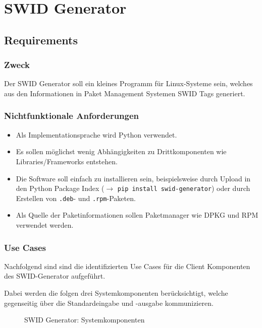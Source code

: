 \chapter{SWID Generator}

\section{Requirements}

\subsection{Zweck}

Der SWID Generator soll ein kleines Programm für Linux-Systeme sein, welches aus
den Informationen in Paket Management Systemen SWID Tags generiert.

\subsection{Nichtfunktionale Anforderungen}

\begin{itemize}
		\item Als Implementationsprache wird Python verwendet.
		\item Es sollen möglichst wenig Abhängigkeiten zu Drittkomponenten wie
			Libraries/Frameworks entstehen.
    \item Die Software soll einfach zu installieren sein, beispielsweise durch
			Upload in den Python Package Index ($\rightarrow$ \texttt{pip install
			swid-generator}) oder durch Erstellen von \texttt{.deb}- und
			\texttt{.rpm}-Paketen.
    \item Als Quelle der Paketinformationen sollen Paketmanager wie DPKG und RPM
			verwendet werden.
\end{itemize}

\subsection{Use Cases}

Nachfolgend sind sind die identifizierten Use Cases für die Client Komponenten
des SWID-Generator aufgeführt.

Dabei werden die folgen drei Systemkomponenten berücksichtigt, welche
gegenseitig über die Standardeingabe und -ausgabe kommunizieren.

\vspace{1em}

\begin{figure}[H]
	\centering
	
	\caption{SWID Generator: Systemkomponenten}
	\label{img:swid-generator-aktoren}
\end{figure}

